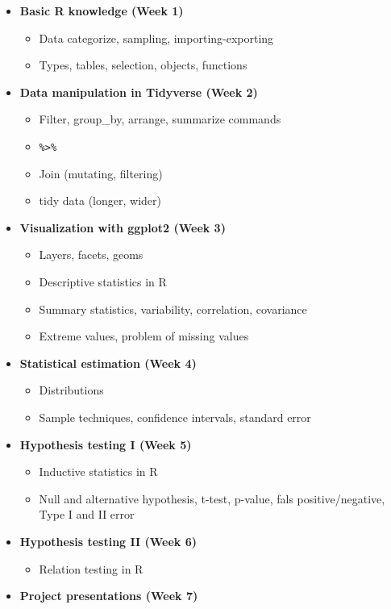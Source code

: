 \documentclass[
]{article}
\providecommand{\tightlist}{%
  \setlength{\itemsep}{0pt}\setlength{\parskip}{0pt}}
\begin{document}
\begin{itemize}
\item
  \textbf{Basic R knowledge (Week 1)}

  \begin{itemize}
  \item
    Data categorize, sampling, importing-exporting
  \item
    Types, tables, selection, objects, functions
  \end{itemize}
\item
  \textbf{Data manipulation in Tidyverse (Week 2)}

  \begin{itemize}
  \item
    Filter, group\_by, arrange, summarize commands
  \item
    \texttt{\%\textgreater{}\%}
  \item
    Join (mutating, filtering)
  \item
    tidy data (longer, wider)
  \end{itemize}
\item
  \textbf{Visualization with ggplot2 (Week 3)}

  \begin{itemize}
  \item
    Layers, facets, geoms
  \item
    Descriptive statistics in R
  \item
    Summary statistics, variability, correlation, covariance
  \item
    Extreme values, problem of missing values
  \end{itemize}
\item
  \textbf{Statistical estimation (Week 4)}

  \begin{itemize}
  \tightlist
  \item
    Distributions
  \item
    Sample techniques, confidence intervals, standard error
  \end{itemize}
\item
  \textbf{Hypothesis testing I (Week 5)}

  \begin{itemize}
  \item
    Inductive statistics in R
  \item
    Null and alternative hypothesis, t-test, p-value, fals
    positive/negative, Type I and II error
  \end{itemize}
\item
  \textbf{Hypothesis testing II (Week 6)}

  \begin{itemize}
  \tightlist
  \item
    Relation testing in R
  \end{itemize}
\item
  \textbf{Project presentations (Week 7)}
\end{itemize}
\end{document}
